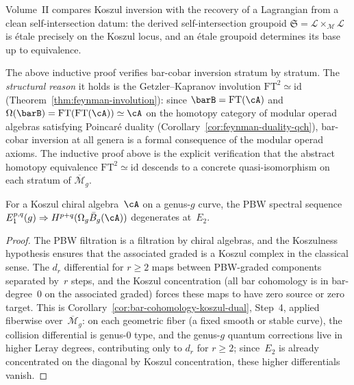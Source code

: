 \begin{remark}
\label{rem:theorem-b-lagrangian}
Volume~II compares Koszul inversion with the recovery
of a Lagrangian from a clean self-intersection datum: the derived
self-intersection groupoid
$\mathfrak{S} = \mathcal{L} \times_{\mathcal{M}} \mathcal{L}$
is \'etale precisely on the Koszul locus, and an \'etale groupoid
determines its base up to equivalence.
\end{remark}

\begin{remark}
\label{rem:inversion-from-ft-squared}
The above inductive proof verifies bar-cobar inversion stratum by
stratum. The \emph{structural reason} it holds is the
Getzler--Kapranov involution
$\mathrm{FT}^2 \simeq \mathrm{id}$
(Theorem~\ref{thm:feynman-involution}): since
$\barB = \mathrm{FT}(\cA)$ and
$\Omega(\barB) = \mathrm{FT}(\mathrm{FT}(\cA)) \simeq \cA$
on the homotopy category of modular operad algebras satisfying
Poincar\'e duality
(Corollary~\ref{cor:feynman-duality-qch}), bar-cobar inversion
at all genera is a formal consequence of the modular operad axioms.
The inductive proof above is the explicit verification that the
abstract homotopy equivalence $\mathrm{FT}^2 \simeq \mathrm{id}$
descends to a concrete quasi-isomorphism on each stratum of
$\overline{\mathcal{M}}_g$.
\end{remark}

\begin{lemma}\label{lem:e2-collapse-higher-genus}
For a Koszul chiral algebra~$\cA$ on a genus-$g$ curve, the PBW
spectral sequence
$E_1^{p,q}(g) \Rightarrow H^{p+q}(\Omega_g \bar{B}_g(\cA))$
degenerates at~$E_2$.
\end{lemma}

\begin{proof}
The PBW filtration is a filtration by chiral algebras, and the
Koszulness hypothesis ensures that the associated graded is a
Koszul complex in the classical sense. The $d_r$ differential
for $r \geq 2$ maps between PBW-graded components separated
by~$r$ steps, and the Koszul concentration (all bar cohomology
is in bar-degree~$0$ on the associated graded) forces these maps
to have zero source or zero target. This is
Corollary~\ref{cor:bar-cohomology-koszul-dual}, Step~4, applied
fiberwise over~$\overline{\mathcal{M}}_g$: on each geometric
fiber (a fixed smooth or stable curve), the collision differential
is genus-$0$ type, and the genus-$g$ quantum corrections live in
higher Leray degrees, contributing only to $d_r$ for $r \geq 2$;
since~$E_2$ is already concentrated on the diagonal by Koszul
concentration, these higher differentials vanish.
\end{proof}

